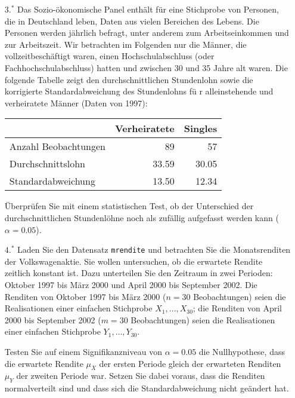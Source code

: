 \documentclass{article}
\begin{document}
\begin{enumerate}
\item[$3.^{\ast }$] Das Sozio-\"{o}konomische Panel enth\"{a}lt f\"{u}r eine
Stichprobe von Personen, die in Deutschland leben, Daten aus vielen
Bereichen des Lebens. Die Personen werden j\"{a}hrlich befragt, unter
anderem zum Arbeitseinkommen und zur Arbeitszeit. Wir betrachten im
Folgenden nur die M\"{a}nner, die vollzeitbesch\"{a}ftigt waren, einen
Hochschulabschluss (oder Fachhochschulabschluss) hatten und zwischen 30 und
35 Jahre alt waren. Die folgende Tabelle zeigt den durchschnittlichen
Stundenlohn sowie die korrigierte Standardabweichung des Stundenlohns f\"{u}%
r alleinstehende und verheiratete M\"{a}nner (Daten von 1997):

\begin{center}%
\begin{tabular}{|l|r|r|}
\hline
& Verheiratete & Singles \\ \hline
Anzahl Beobachtungen & 89 & 57 \\ 
Durchschnittslohn & 33.59 & 30.05 \\ 
Standardabweichung & 13.50 & 12.34 \\ \hline
\end{tabular}
\end{center}%

\"{U}berpr\"{u}fen Sie mit einem statistischen Test, ob der Unterschied der
durchschnittlichen Stundenl\"{o}hne noch als zuf\"{a}llig aufgefasst werden
kann ($\alpha =0.05$).

\item[$4.^{\ast }$] Laden Sie den Datensatz \texttt{mrendite} und betrachten
Sie die Monatsrenditen der Volkswagenaktie. Sie wollen untersuchen, ob die
erwartete Rendite zeitlich konstant ist. Dazu unterteilen Sie den Zeitraum
in zwei Perioden: Oktober 1997 bis M\"{a}rz 2000 und April 2000 bis
September 2002. Die Renditen von Oktober 1997 bis M\"{a}rz 2000 ($n=30$
Beobachtungen) seien die Realisationen einer einfachen Stichprobe $%
X_{1},\dots ,X_{30}$; die Renditen von April 2000 bis September 2002 ($m=30$
Beobachtungen) seien die Realisationen einer einfachen Stichprobe $%
Y_{1},\ldots ,Y_{30}$.

Testen Sie auf einem Signifikanzniveau von $\alpha =0.05$ die Nullhypothese,
dass die erwartete Rendite $\mu _{X}$ der ersten Periode gleich der
erwarteten Renditen $\mu _{Y}$ der zweiten Periode war. Setzen Sie dabei
voraus, dass die Renditen normalverteilt sind und dass sich die
Standardabweichung nicht ge\"{a}ndert hat.


\end{enumerate}
\end{document}
